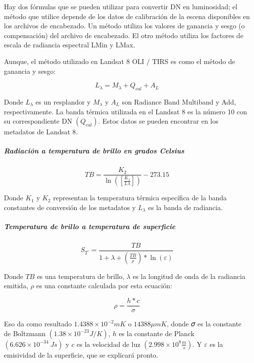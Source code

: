 \documentclass[
]{article}
\begin{document}
Hay dos fórmulas que se pueden utilizar para convertir DN en
luminosidad; el método que utilice depende de los datos de calibración
de la escena disponibles en los archivos de encabezado. Un método
utiliza los valores de ganancia y sesgo (o compensación) del archivo de
encabezado. El otro método utiliza los factores de escala de radiancia
espectral LMin y LMax.

Aunque, el método utilizado en Landsat 8 OLI / TIRS es como el método de
ganancia y sesgo:

\[ L_{\lambda} = M_{\lambda} + Q_{cal} + A_{L}\]

Donde \(L_{\lambda}\) es un resplandor y \(M_{\lambda}\) y \(A_{L}\) son
Radiance Band Multiband y Add, respectivamente. La banda térmica
utilizada en el Landsat 8 es la número 10 con su correspondiente DN
\((𝑄_{cal})\). Estos datos se pueden encontrar en los metadatos de
Landsat 8.

\hypertarget{radiaciuxf3n-a-temperatura-de-brillo-en-grados-celsius}{%
\subparagraph{\texorpdfstring{\textbf{\emph{Radiación a temperatura de
brillo en grados
Celsius}}}{Radiación a temperatura de brillo en grados Celsius}}\label{radiaciuxf3n-a-temperatura-de-brillo-en-grados-celsius}}

\[ TB = \frac{K_{2}}{\ln([\frac{K_{1}}{L\lambda}])} - 273.15\]

Donde \(K_{1}\) y \(K_{2}\) representan la temperatura térmica
específica de la banda constantes de conversión de los metadatos y
\(L_{\lambda}\) es la banda de radiancia.

\hypertarget{temperatura-de-brillo-a-temperatura-de-superficie}{%
\subparagraph{\texorpdfstring{\emph{Temperatura de brillo a temperatura
de
superficie}}{Temperatura de brillo a temperatura de superficie}}\label{temperatura-de-brillo-a-temperatura-de-superficie}}

\[ S_{T^{°}} = \frac{TB}{1+\lambda+(\frac{TB}{\rho}) * \ln(\varepsilon)} \]

Donde \(TB\) es una temperatura de brillo, \(\lambda\) es la longitud de
onda de la radiancia emitida, \(\rho\) es una constante calculada por
esta ecuación:

\[ \rho = \frac{h *c}{\sigma} \]

Eso da como resultado \(1.4388 × 10^{-2} m K\) o \(14388 \mu m K\),
donde 𝜎 es la constante de Boltzmann \((1.38 × 10^{−23} J / K)\), \(h\)
es la constante de Planck \((6.626 × 10^{−34} \ J s)\) y \(c\) es la
velocidad de luz \((2.998 × 10^{8} \frac{m}{s})\). Y \(\varepsilon\) es
la emisividad de la superficie, que se explicará pronto.
\end{document}
